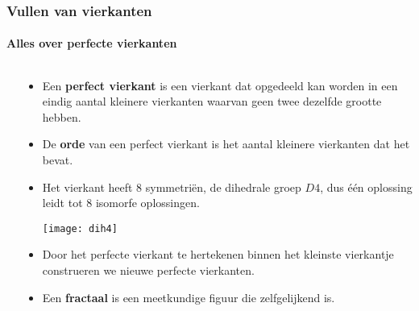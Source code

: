 \begin{frame}
  \frametitle{Vullen van vierkanten}
  \framesubtitle{Alles over perfecte vierkanten}
  \begin{columns}
    \begin{column}{0.4\textwidth}
      \only<1-3>{}
    \end{column}
    \begin{column}{0.6\textwidth}
    {\scriptsize
      \begin{itemize}
        \item Een {\bf perfect vierkant} is een vierkant dat opgedeeld kan worden in een eindig aantal kleinere vierkanten waarvan geen twee dezelfde grootte hebben.
        \item De {\bf orde} van een perfect vierkant is het aantal kleinere vierkanten dat het bevat.
        \pause
        \item Het vierkant heeft $8$ symmetriën, de dihedrale groep $D4$, dus één oplossing leidt tot 8 isomorfe oplossingen.
          \begin{center}
            \texttt{[image: dih4]}
          \end{center}
        \pause
        \item Door het perfecte vierkant te hertekenen binnen het kleinste vierkantje construeren we nieuwe perfecte vierkanten.
        \item Een {\bf fractaal} is een meetkundige figuur die zelfgelijkend is. 
      \end{itemize}
    }
    \end{column}
  \end{columns}  
\end{frame}

